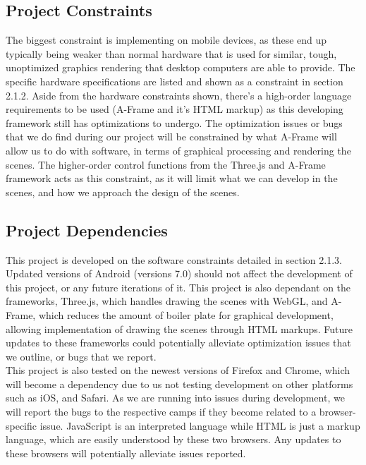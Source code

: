\documentclass[letterpaper,10pt,titlepage,draftclsnofoot,onecolumn,compsoc,utf8,latin1]{IEEEtran}
\begin{document}
\subsection{Project Constraints}
\begin{singlespace}
\noindent
The biggest constraint is implementing on mobile devices, as these end up typically being weaker than normal hardware that is used for similar, tough, unoptimized graphics rendering that desktop computers are able to provide. The specific hardware specifications are listed and shown as a constraint in section 2.1.2. Aside from the hardware constraints shown, there's a high-order language requirements to be used (A-Frame and it's HTML markup) as this developing framework still has optimizations to undergo. The optimization issues or bugs that we do find during our project will be constrained by what A-Frame will allow us to do with software, in terms of graphical processing and rendering the scenes. The higher-order control functions from the Three.js and A-Frame framework acts as this constraint, as it will limit what we can develop in the scenes, and how we approach the design of the scenes.
\end{singlespace}

\subsection{Project Dependencies}
\begin{singlespace}
\noindent
This project is developed on the software constraints detailed in section 2.1.3. Updated versions of Android (versions  7.0) should not affect the development of this project, or any future iterations of it. This project is also dependant on the frameworks, Three.js, which handles drawing the scenes with WebGL, and A-Frame, which reduces the amount of boiler plate for graphical development, allowing implementation of drawing the scenes through HTML markups. Future updates to these frameworks could potentially alleviate optimization issues that we outline, or bugs that we report.\\

\noindent
This project is also tested on the newest versions of Firefox and Chrome, which will become a dependency due to us not testing development on other platforms such as iOS, and Safari. As we are running into issues during development, we will report the bugs to the respective camps if they become related to a browser-specific issue. JavaScript is an interpreted language while HTML is just a markup language, which are easily understood by these two browsers. Any updates to these browsers will potentially alleviate issues reported.
\end{singlespace}
\end{document}
